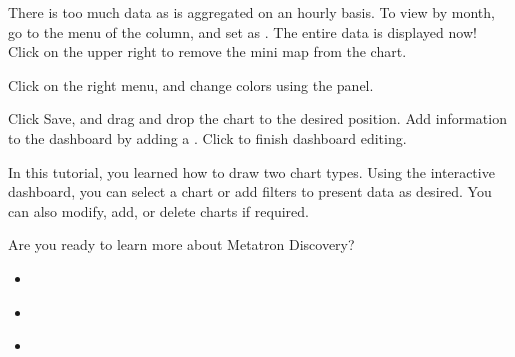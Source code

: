 \documentclass[letterpaper,10pt,english]{sphinxmanual}
\begin{document}
There is too much data as  is aggregated on an hourly basis. To view by month, go to the menu of the  column, and set  as . The entire data is displayed now! Click  on the upper right to remove the mini map from the chart.
\begin{quote}

\begin{figure}[H]
\centering

\noindent{}
\end{figure}
\end{quote}

Click  on the right menu, and change colors using the  panel.
\begin{quote}

\begin{figure}[H]
\centering

\noindent{}
\end{figure}
\end{quote}

Click Save, and drag and drop the chart to the desired position. Add information to the dashboard by adding a . Click  to finish dashboard editing.
\begin{quote}

\begin{figure}[H]
\centering

\noindent{}
\end{figure}
\end{quote}

In this tutorial, you learned how to draw two chart types. Using the interactive dashboard, you can select a chart or add filters to present data as desired. You can also modify, add, or delete charts if required.
\begin{quote}

\begin{figure}[H]
\centering

\noindent{}
\end{figure}
\end{quote}

Are you ready to learn more about Metatron Discovery?
\begin{itemize}
\item {} 
{\hyperref[\detokenize{discovery/part01/overview::doc}]{}}

\item {} 
{\hyperref[\detokenize{discovery/part01/structure::doc}]{}}

\item {} 
{\hyperref[\detokenize{discovery/part01/engine::doc}]{}}

\end{itemize}
\end{document}
